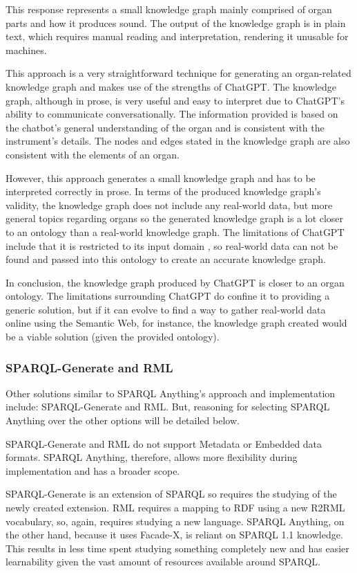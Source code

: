 This response represents a small knowledge graph mainly comprised of organ parts and how it produces sound. The output of the knowledge graph is in plain text, which requires manual reading and interpretation, rendering it unusable for machines.

This approach is a very straightforward technique for generating an organ-related knowledge graph and makes use of the strengths of ChatGPT. The knowledge graph, although in prose, is very useful and easy to interpret due to ChatGPT's ability to communicate conversationally. The information provided is based on the chatbot's general understanding of the organ and is consistent with the instrument's details. The nodes and edges stated in the knowledge graph are also consistent with the elements of an organ. 

However, this approach generates a small knowledge graph and has to be interpreted correctly in prose. In terms of the produced knowledge graph's validity, the knowledge graph does not include any real-world data, but more general topics regarding organs so the generated knowledge graph is a lot closer to an ontology than a real-world knowledge graph. The limitations of ChatGPT include that it is restricted to its input domain \cite{chatgptwebsite}, so real-world data can not be found and passed into this ontology to create an accurate knowledge graph. 

In conclusion, the knowledge graph produced by ChatGPT is closer to an organ ontology. The limitations surrounding ChatGPT do confine it to providing a generic solution, but if it can evolve to find a way to gather real-world data online using the Semantic Web, for instance, the knowledge graph created would be a viable solution (given the provided ontology).

\subsubsection{SPARQL-Generate and RML}
\hspace{0.5cm} Other solutions similar to SPARQL Anything's approach and implementation include: SPARQL-Generate and RML. But, reasoning for selecting SPARQL Anything over the other options will be detailed below.

SPARQL-Generate and RML do not support Metadata or Embedded data formats. \cite{sparqlanything} SPARQL Anything, therefore, allows more flexibility during implementation and has a broader scope. 

SPARQL-Generate is an extension of SPARQL so requires the studying of the newly created extension. RML requires a mapping to RDF using a new R2RML vocabulary, so, again, requires studying a new language. SPARQL Anything, on the other hand, because it uses Facade-X, is reliant on SPARQL 1.1 knowledge. \cite{sparqlanything} This results in less time spent studying something completely new and has easier learnability given the vast amount of resources available around SPARQL.

